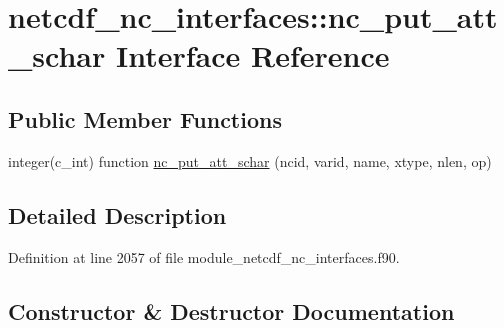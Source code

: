 \hypertarget{interfacenetcdf__nc__interfaces_1_1nc__put__att__schar}{}\section{netcdf\+\_\+nc\+\_\+interfaces\+:\+:nc\+\_\+put\+\_\+att\+\_\+schar Interface Reference}
\label{interfacenetcdf__nc__interfaces_1_1nc__put__att__schar}
\subsection*{Public Member Functions}
\begin{DoxyCompactItemize}
\item 
integer(c\+\_\+int) function \hyperlink{interfacenetcdf__nc__interfaces_1_1nc__put__att__schar_aaf0eddaf4903bd058dab561f8879d5e0}{nc\+\_\+put\+\_\+att\+\_\+schar} (ncid, varid, name, xtype, nlen, op)
\end{DoxyCompactItemize}


\subsection{Detailed Description}


Definition at line 2057 of file module\+\_\+netcdf\+\_\+nc\+\_\+interfaces.\+f90.



\subsection{Constructor \& Destructor Documentation}
\mbox{\label{interfacenetcdf__nc__interfaces_1_1nc__put__att__schar_aaf0eddaf4903bd058dab561f8879d5e0}} 
